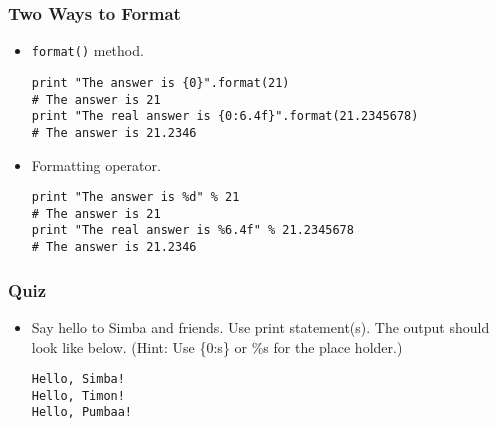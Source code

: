 \documentclass{beamer}
\begin{document}
\begin{frame}[fragile]
\frametitle{Two Ways to Format}
\begin{itemize}
\item \lstinline{format()} method.
\begin{lstlisting}
print "The answer is {0}".format(21)
# The answer is 21
print "The real answer is {0:6.4f}".format(21.2345678)
# The answer is 21.2346
\end{lstlisting}
\item Formatting operator.
\begin{lstlisting}
print "The answer is %d" % 21
# The answer is 21
print "The real answer is %6.4f" % 21.2345678
# The answer is 21.2346
\end{lstlisting}
\end{itemize}
\end{frame}

\begin{frame}[fragile]
\frametitle{Quiz}
\begin{itemize}
\item Say hello to Simba and friends. Use print statement(s).
    The output should look like below. (Hint: Use
    \{0:s\} or \%s for the place holder.)
\begin{lstlisting}
Hello, Simba!
Hello, Timon!
Hello, Pumbaa!
\end{lstlisting}
\end{itemize}
\end{frame}
\end{document}
